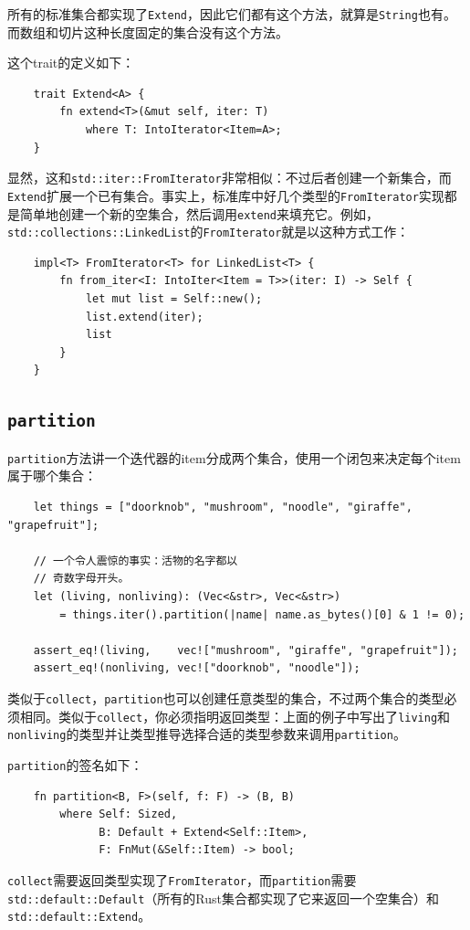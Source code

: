 所有的标准集合都实现了\texttt{Extend}，因此它们都有这个方法，就算是\texttt{String}也有。而数组和切片这种长度固定的集合没有这个方法。

这个trait的定义如下：
\begin{verbatim}
    trait Extend<A> {
        fn extend<T>(&mut self, iter: T)
            where T: IntoIterator<Item=A>;
    }
\end{verbatim}
显然，这和\texttt{std::iter::FromIterator}非常相似：不过后者创建一个新集合，而\texttt{Extend}扩展一个已有集合。事实上，标准库中好几个类型的\texttt{FromIterator}实现都是简单地创建一个新的空集合，然后调用\texttt{extend}来填充它。例如，\texttt{std::collections::LinkedList}的\texttt{FromIterator}就是以这种方式工作：
\begin{verbatim}
    impl<T> FromIterator<T> for LinkedList<T> {
        fn from_iter<I: IntoIter<Item = T>>(iter: I) -> Self {
            let mut list = Self::new();
            list.extend(iter);
            list
        }
    }
\end{verbatim}

\subsection{\texttt{partition}}
\texttt{partition}方法讲一个迭代器的item分成两个集合，使用一个闭包来决定每个item属于哪个集合：
\begin{verbatim}
    let things = ["doorknob", "mushroom", "noodle", "giraffe", "grapefruit"];

    // 一个令人震惊的事实：活物的名字都以
    // 奇数字母开头。
    let (living, nonliving): (Vec<&str>, Vec<&str>)
        = things.iter().partition(|name| name.as_bytes()[0] & 1 != 0);
    
    assert_eq!(living,    vec!["mushroom", "giraffe", "grapefruit"]);
    assert_eq!(nonliving, vec!["doorknob", "noodle"]);
\end{verbatim}

类似于\texttt{collect}，\texttt{partition}也可以创建任意类型的集合，不过两个集合的类型必须相同。类似于\texttt{collect}，你必须指明返回类型：上面的例子中写出了\texttt{living}和\texttt{nonliving}的类型并让类型推导选择合适的类型参数来调用\texttt{partition}。

\texttt{partition}的签名如下：
\begin{verbatim}
    fn partition<B, F>(self, f: F) -> (B, B)
        where Self: Sized,
              B: Default + Extend<Self::Item>,
              F: FnMut(&Self::Item) -> bool;
\end{verbatim}
\texttt{collect}需要返回类型实现了\texttt{FromIterator}，而\texttt{partition}需要\texttt{std::default::Default}（所有的Rust集合都实现了它来返回一个空集合）和\texttt{std::default::Extend}。

